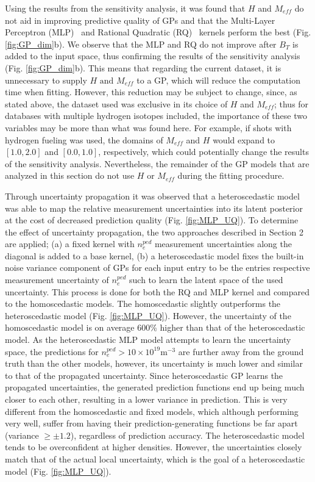 \documentclass[a4paper, twoside, final, 12pt]{article}
\begin{document}
{Using the results from the sensitivity analysis, it was found that $H$ and $M_{eff}$ do not aid in improving predictive quality of GPs and that the Multi-Layer Perceptron (MLP)~\cite{gpy_MLP} and Rational Quadratic (RQ)~\cite{kernel_cookbook} kernels perform the best (Fig. \ref{fig:GP_dim}b).  We observe that the MLP and RQ do not improve after $B_T$ is added to the input space, thus confirming the results of the sensitivity analysis (Fig. \ref{fig:GP_dim}b). This means that regarding the current dataset, it is unnecessary to supply $H \text{ and } M_{eff}$ to a GP, which will reduce the computation time when fitting. However, this reduction may be subject to change, since, as stated above, the dataset used was exclusive in its choice of $H$ and $M_{eff}$; thus for databases with multiple hydrogen isotopes included, the importance of these two variables may be more than what was found here. For example, if shots with hydrogen fueling was used, the domains of $M_{eff}$ and $H$ would expand to $[1.0, 2.0]$ and  $[0.0, 1.0]$, respectively, which could potentially change the results of the sensitivity analysis.  Nevertheless, the remainder of the GP models that are analyzed in this section do not use $H$ or $M_{eff}$ during the fitting procedure. 

 

Through uncertainty propagation it was observed that a heteroscedastic model was able to map the relative measurement uncertainties into its latent posterior at the cost of decreased prediction quality (Fig.  \ref{fig:MLP_UQ}). 
To determine the effect of uncertainty propagation, the two approaches described in Section 2 are applied; (a) a fixed kernel with $n_e^{ped}$ measurement uncertainties along the diagonal is added to a base kernel, (b) a heteroscedastic model fixes the built-in noise variance component of GPs for each input entry to be the entries respective measurement uncertainty of $n_e^{ped}$ such to learn the latent space of the used uncertainty. This process is done for both the RQ and MLP kernel and compared to the homoscedastic models.
The homoscedastic slightly outperforms the heteroscedastic model (Fig. \ref{fig:MLP_UQ}). However, the uncertainty of the homoscedastic model is on average 600\% higher than that of the heteroscedastic model. As the heteroscedastic MLP model attempts to learn the uncertainty space, the predictions for $n_e^{ped} > 10 \times 10^{19}\text{m}^{-3}$ are further away from the ground truth than the other models, however, its uncertainty is much lower and similar to that of the propagated uncertainty. Since heteroscedastic GP learns the propagated uncertainties, the generated prediction functions end up being much closer to each other, resulting in a lower variance in prediction. This is very different from the homoscedastic and fixed models, which although performing very well, suffer from having their prediction-generating functions be far apart (variance $ \geq \pm 1.2$), regardless of prediction accuracy. The heteroscedastic model tends to be overconfident at higher densities. However, the uncertainties closely match that of the actual local uncertainty, which is the goal of a heteroscedastic model (Fig. \ref{fig:MLP_UQ}).

}
\end{document}
